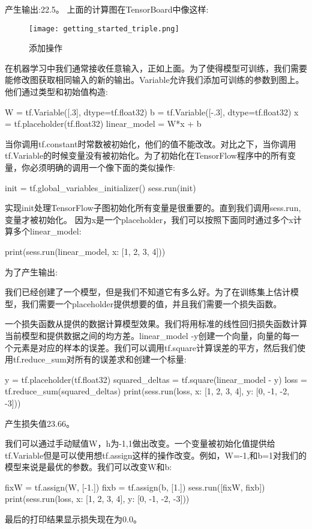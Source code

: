 产生输出:22.5。
上面的计算图在TensorBoard中像这样:
\begin{figure}[H]
\centering
\texttt{[image: getting\_started\_triple.png]}
\caption{添加操作}
\end{figure}
在机器学习中我们通常接收任意输入，正如上面。为了使得模型可训练，我们需要能修改图获取相同输入的新的输出。Variable允许我们添加可训练的参数到图上。他们通过类型和初始值构造:
\begin{pythoncode}
W = tf.Variable([.3], dtype=tf.float32)
b = tf.Variable([-.3], dtype=tf.float32)
x = tf.placeholder(tf.float32)
linear_model = W*x + b
\end{pythoncode}
当你调用tf.constant时常数被初始化，他们的值不能改改。对比之下，当你调用tf.Variable的时候变量没有被初始化。为了初始化在TensorFlow程序中的所有变量，你必须明确的调用一个像下面的类似操作:
\begin{pythoncode}
init = tf.global_variables_initializer()
sess.run(init)
\end{pythoncode}
实现init处理TensorFlow子图初始化所有变量是很重要的。直到我们调用sess.run,变量才被初始化。
因为x是一个placeholder，我们可以按照下面同时通过多个x计算多个linear\_model:
\begin{pythoncode}
print(sess.run(linear_model, {x: [1, 2, 3, 4]}))
\end{pythoncode}
为了产生输出:
\begin{pythoncode}
[ 0.          0.30000001  0.60000002  0.90000004]
\end{pythoncode}
我们已经创建了一个模型，但是我们不知道它有多么好。为了在训练集上估计模型，我们需要一个placeholder提供想要的值，并且我们需要一个损失函数。

一个损失函数从提供的数据计算模型效果。我们将用标准的线性回归损失函数计算当前模型和提供数据之间的均方差。linear\_model -y创建一个向量，向量的每一个元素是对应的样本的误差。我们可以调用tf.square计算误差的平方，然后我们使用tf.reduce\_sum对所有的误差求和创建一个标量:
\begin{pythoncode}
y = tf.placeholder(tf.float32)
squared_deltas = tf.square(linear_model - y)
loss = tf.reduce_sum(squared_deltas)
print(sess.run(loss, {x: [1, 2, 3, 4], y: [0, -1, -2, -3]}))
\end{pythoncode}
产生损失值23.66。

我们可以通过手动赋值W，h为-1,1做出改变。一个变量被初始化值提供给tf.Variable但是可以使用想tf.assign这样的操作改变。例如，W=-1,和b=1对我们的模型来说是最优的参数。我们可以改变W和b:
\begin{pythoncode}
fixW = tf.assign(W, [-1.])
fixb = tf.assign(b, [1.])
sess.run([fixW, fixb])
print(sess.run(loss, {x: [1, 2, 3, 4], y: [0, -1, -2, -3]}))
\end{pythoncode}
最后的打印结果显示损失现在为0.0。

